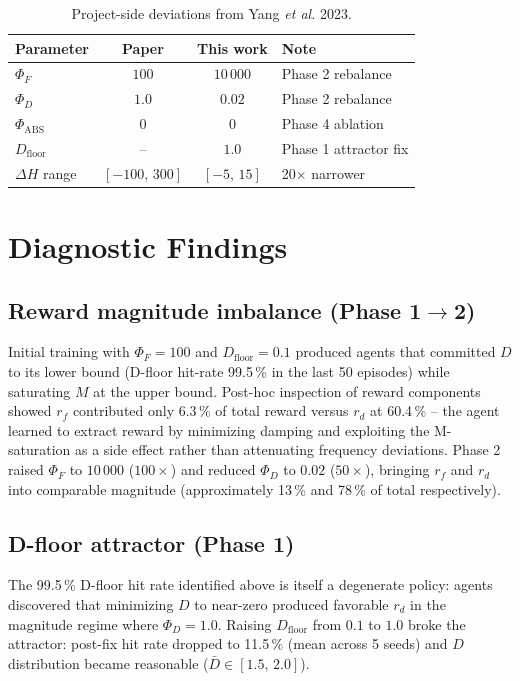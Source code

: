 \documentclass[journal,onecolumn,11pt]{IEEEtran}
\begin{document}
\begin{table}[!t]
  \centering
  \caption{Project-side deviations from Yang \emph{et al.} 2023.}
  \label{tab:deviations}
  \begin{tabular}{lccl}
    \toprule
    Parameter & Paper & This work & Note \\
    \midrule
    $\Phi_F$        & $100$ & $10\,000$ & Phase 2 rebalance \\
    $\Phi_D$        & $1.0$ & $0.02$    & Phase 2 rebalance \\
    $\Phi_{\text{ABS}}$ & $0$ & $0$    & Phase 4 ablation \\
    $D_{\text{floor}}$  & --  & $1.0$   & Phase 1 attractor fix \\
    $\Delta H$ range    & $[-100,\,300]$ & $[-5,\,15]$ & 20$\times$ narrower \\
    \bottomrule
  \end{tabular}
\end{table}

\section{Diagnostic Findings}\label{sec:diagnostic}

\subsection{Reward magnitude imbalance (Phase 1$\rightarrow$2)}

Initial training with $\Phi_F = 100$ and $D_{\text{floor}} = 0.1$
produced agents that committed $D$ to its lower bound (D-floor
hit-rate 99.5\,\% in the last 50 episodes) while saturating $M$ at the
upper bound. Post-hoc inspection of reward components showed
$r_f$ contributed only 6.3\,\% of total reward versus $r_d$ at
60.4\,\% -- the agent learned to extract reward by minimizing damping
and exploiting the M-saturation as a side effect rather than
attenuating frequency deviations. Phase 2 raised $\Phi_F$ to $10\,000$
($100\times$) and reduced $\Phi_D$ to $0.02$ ($50\times$), bringing
$r_f$ and $r_d$ into comparable magnitude (approximately 13\,\% and
78\,\% of total respectively).

\subsection{D-floor attractor (Phase 1)}

The 99.5\,\% D-floor hit rate identified above is itself a degenerate
policy: agents discovered that minimizing $D$ to near-zero produced
favorable $r_d$ in the magnitude regime where $\Phi_D = 1.0$. Raising
$D_{\text{floor}}$ from $0.1$ to $1.0$ broke the attractor: post-fix
hit rate dropped to 11.5\,\% (mean across 5 seeds) and $D$
distribution became reasonable ($\bar{D} \in [1.5,\,2.0]$).
\end{document}
